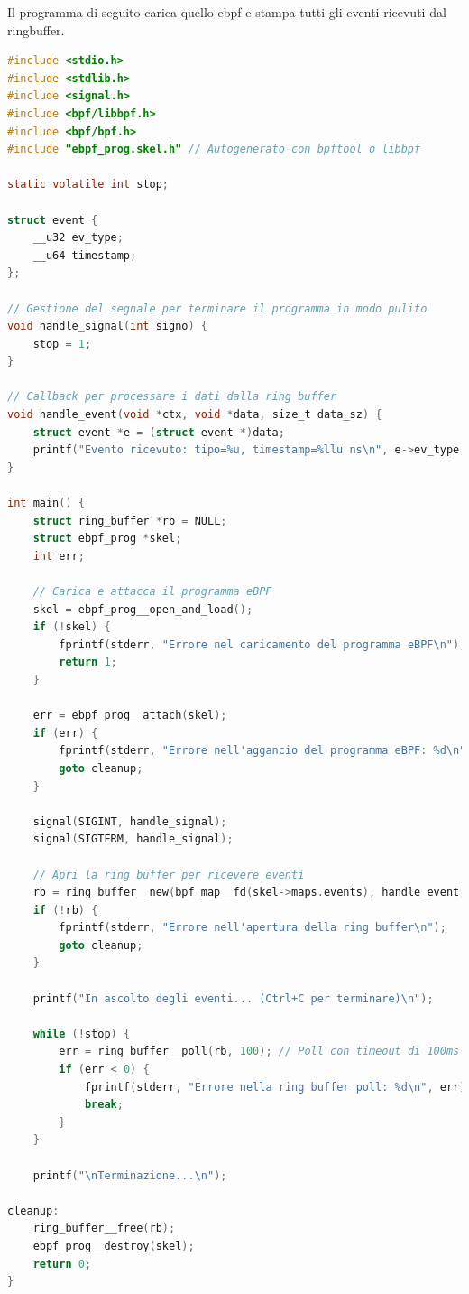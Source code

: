 \documentclass{article}
\begin{document}
Il programma di seguito carica quello ebpf e stampa tutti gli eventi ricevuti dal ringbuffer.

\begin{lstlisting}[language=C, caption={Esempio di un programma user-space che riceve gli eventi dal ringbuffer}]
#include <stdio.h>
#include <stdlib.h>
#include <signal.h>
#include <bpf/libbpf.h>
#include <bpf/bpf.h>
#include "ebpf_prog.skel.h" // Autogenerato con bpftool o libbpf

static volatile int stop;

struct event {
    __u32 ev_type;
    __u64 timestamp;
};

// Gestione del segnale per terminare il programma in modo pulito
void handle_signal(int signo) {
    stop = 1;
}

// Callback per processare i dati dalla ring buffer
void handle_event(void *ctx, void *data, size_t data_sz) {
    struct event *e = (struct event *)data;
    printf("Evento ricevuto: tipo=%u, timestamp=%llu ns\n", e->ev_type, e->timestamp);
}

int main() {
    struct ring_buffer *rb = NULL;
    struct ebpf_prog *skel;
    int err;

    // Carica e attacca il programma eBPF
    skel = ebpf_prog__open_and_load();
    if (!skel) {
        fprintf(stderr, "Errore nel caricamento del programma eBPF\n");
        return 1;
    }

    err = ebpf_prog__attach(skel);
    if (err) {
        fprintf(stderr, "Errore nell'aggancio del programma eBPF: %d\n", err);
        goto cleanup;
    }

    signal(SIGINT, handle_signal);
    signal(SIGTERM, handle_signal);

    // Apri la ring buffer per ricevere eventi
    rb = ring_buffer__new(bpf_map__fd(skel->maps.events), handle_event, NULL, NULL);
    if (!rb) {
        fprintf(stderr, "Errore nell'apertura della ring buffer\n");
        goto cleanup;
    }

    printf("In ascolto degli eventi... (Ctrl+C per terminare)\n");

    while (!stop) {
        err = ring_buffer__poll(rb, 100); // Poll con timeout di 100ms
        if (err < 0) {
            fprintf(stderr, "Errore nella ring buffer poll: %d\n", err);
            break;
        }
    }

    printf("\nTerminazione...\n");

cleanup:
    ring_buffer__free(rb);
    ebpf_prog__destroy(skel);
    return 0;
}
\end{lstlisting}
\end{document}

